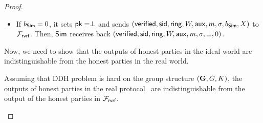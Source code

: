 \begin{proof}
\begin{itemize}
\begin{itemize}
\begin{itemize}
			\end{itemize}
			\item If $ b_{\mathsf{Sim}} = 0 $, it sets $ \mathsf{pk} = \perp $ and sends  $ (\mathsf{verified}, \textsf{sid}, \mathsf{ring}, W,\mathsf{aux}, m, \sigma, b_{\mathsf{Sim}}, X) $ to $ \mathcal{F}_{\textsf{rvrf}} $. Then, $ \mathsf{Sim} $ receives back $ (\mathsf{verified}, \textsf{sid}, \mathsf{ring}, W, \mathsf{aux},m, \sigma, \perp, 0) $. 
			
		\end{itemize}
		
		
		
		
		
		
	\end{itemize}

	Now, we need to show that the outputs of honest parties in the ideal world are indistinguishable from the honest parties in the real world. 
	
	\begin{lemma}\label{lem:honestoutput}
			Assuming that DDH problem is hard on the group structure $ ({\mathbf{G}}, G,K) $, the outputs of honest parties in the real protocol \name\ are indistinguishable from the output of the honest parties in $ \mathcal{F}_{\textsf{rvrf}} $.
	\end{lemma}
		

\end{proof}
